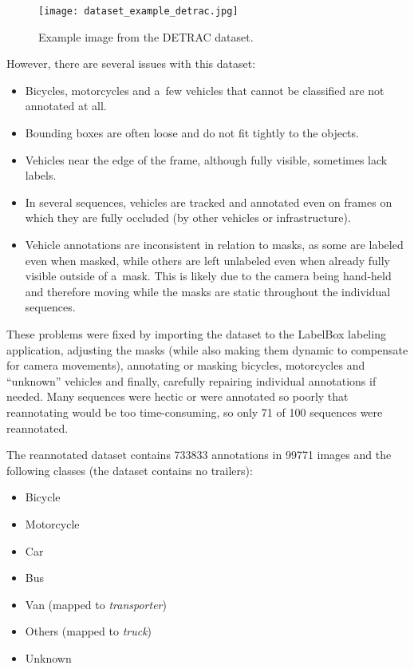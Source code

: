 \begin{figure}[t]
    \centering
    \texttt{[image: dataset\_example\_detrac.jpg]}
    \caption{Example image from the DETRAC dataset.}
    \label{DetracDatasetExample}
\end{figure}

However, there are several issues with this dataset:
\begin{itemize}
    \item Bicycles, motorcycles and a~few vehicles that cannot be classified are
    not annotated at all.
    \item Bounding boxes are often loose and do not fit tightly to the objects.
    \item Vehicles near the edge of the frame, although fully visible, sometimes
    lack labels.
    \item In several sequences, vehicles are tracked and annotated even on
    frames on which they are fully occluded (by other vehicles or
    infrastructure).
    \item Vehicle annotations are inconsistent in relation to masks, as some are
    labeled even when masked, while others are left unlabeled even when already
    fully visible outside of a~mask. This is likely due to the camera being
    hand-held and therefore moving while the masks are static throughout the
    individual sequences.
\end{itemize}

These problems were fixed by importing the dataset to the LabelBox labeling
application, adjusting the masks (while also making them dynamic to compensate
for camera movements), annotating or masking bicycles, motorcycles and
``unknown'' vehicles and finally, carefully repairing individual annotations if
needed. Many sequences were hectic or were annotated so poorly that reannotating
would be too time-consuming, so only 71 of 100 sequences were reannotated.

The reannotated dataset contains \num{733833} annotations in \num{99771}
images and the following classes (the dataset contains no trailers):
\begin{itemize}
    \item Bicycle
    \item Motorcycle
    \item Car
    \item Bus
    \item Van (mapped to \textit{transporter})
    \item Others (mapped to \textit{truck})
    \item Unknown
\end{itemize}



